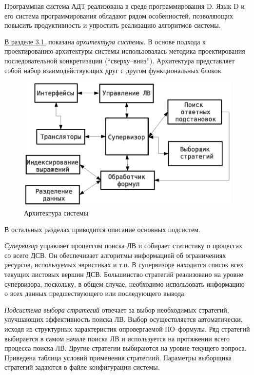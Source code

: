 \documentclass[a4paper]{report}
\begin{document}
Программная система АДТ реализована в среде программирования D. Язык D и его система программирования обладают рядом особенностей, позволяющих повысить продуктивность и упростить реализацию алгоритмов системы.

\underline{В разделе 3.1.} показана \emph{архитектура системы}. В основе подхода к проектированию архитектуры системы использовалась методика проектирования последовательной конкретизации (``сверху--вниз''). Архитектура представляет собой набор взаимодействующих друг с другом функциональных блоков.
\begin{figure}[htb]
    \centering
    \includegraphics[width=0.6\linewidth]{pics/Design1.eps}
    \caption{Архитектура системы}
    \label{fig:design1}
\end{figure}

В остальных разделах приводится описание основных подсистем.

\emph{Супервизор} управляет процессом поиска ЛВ и собирает статистику о процессах со всего ДСВ. Он обеспечивает алгоритмы информацией об ограничениях ресурсов, используемых эвристиках и т.п. В супервизоре находится список всех текущих листовых вершин ДСВ. Большинство стратегий реализовано на уровне супервизора, поскольку, в общем случае, необходимо использовать информацию о всех данных предшествующего или последующего вывода.

\emph{Подсистема выбора стратегий} отвечает за выбор необходимых стратегий, улучшающих эффективность поиска ЛВ. Выбор осуществляется автоматически, исходя из структурных характеристик опровергаемой ПО--формулы. Ряд стратегий выбирается в самом начале поиска ЛВ и используется на протяжении всего процесса поиска ЛВ. Другие стратегии выбираются на уровне текущего вопроса. Приведена таблица условий применения стратегиий. Параметры выборщика стратегий задаются в файле конфигурации системы.
\end{document}
